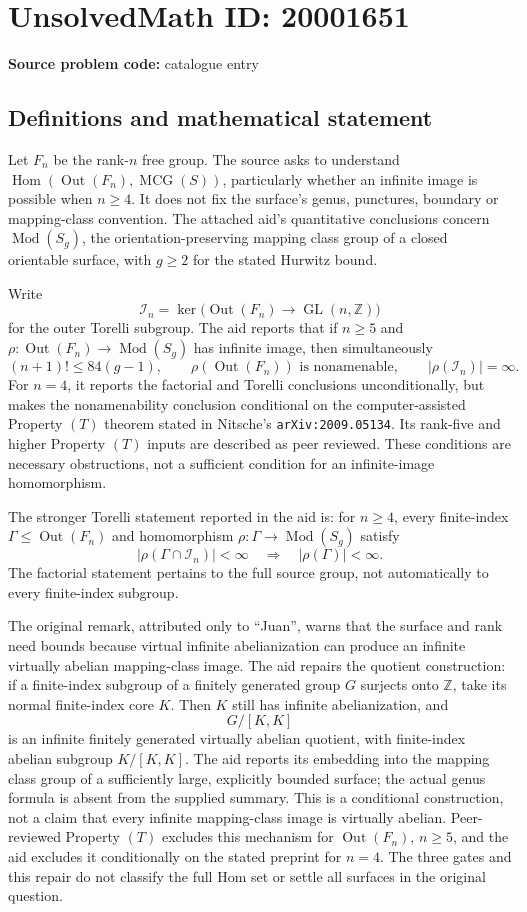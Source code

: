 \documentclass[11pt]{article}
\newcommand{\Z}{\mathbb{Z}}
\begin{document}
\section*{UnsolvedMath ID: 20001651}
\textbf{Source problem code:} catalogue entry
\subsection{Definitions and mathematical statement}
Let \(F_n\) be the rank-\(n\) free group. The source asks to understand \(\operatorname{Hom}(\operatorname{Out}(F_n),\operatorname{MCG}(S))\), particularly whether an infinite image is possible when \(n\ge4\). It does not fix the surface's genus, punctures, boundary or mapping-class convention. The attached aid's quantitative conclusions concern \(\operatorname{Mod}(S_g)\), the orientation-preserving mapping class group of a closed orientable surface, with \(g\ge2\) for the stated Hurwitz bound.

Write
\[
 \mathcal I_n=\ker\bigl(\operatorname{Out}(F_n)\to\operatorname{GL}(n,\Z)\bigr)
\]
for the outer Torelli subgroup. The aid reports that if \(n\ge5\) and \(\rho:\operatorname{Out}(F_n)\to\operatorname{Mod}(S_g)\) has infinite image, then simultaneously
\[
 (n+1)!\le84(g-1),\qquad
 \rho(\operatorname{Out}(F_n))\text{ is nonamenable},\qquad
 |\rho(\mathcal I_n)|=\infty.
\]
For \(n=4\), it reports the factorial and Torelli conclusions unconditionally, but makes the nonamenability conclusion conditional on the computer-assisted Property \((T)\) theorem stated in Nitsche's \texttt{arXiv:2009.05134}. Its rank-five and higher Property \((T)\) inputs are described as peer reviewed. These conditions are necessary obstructions, not a sufficient condition for an infinite-image homomorphism.

The stronger Torelli statement reported in the aid is: for \(n\ge4\), every finite-index \(\Gamma\le\operatorname{Out}(F_n)\) and homomorphism \(\rho:\Gamma\to\operatorname{Mod}(S_g)\) satisfy
\[
 |\rho(\Gamma\cap\mathcal I_n)|<\infty
 \quad\Longrightarrow\quad |\rho(\Gamma)|<\infty.
\]
The factorial statement pertains to the full source group, not automatically to every finite-index subgroup.

The original remark, attributed only to ``Juan'', warns that the surface and rank need bounds because virtual infinite abelianization can produce an infinite virtually abelian mapping-class image. The aid repairs the quotient construction: if a finite-index subgroup of a finitely generated group \(G\) surjects onto \(\Z\), take its normal finite-index core \(K\). Then \(K\) still has infinite abelianization, and
\[
 G/[K,K]
\]
is an infinite finitely generated virtually abelian quotient, with finite-index abelian subgroup \(K/[K,K]\). The aid reports its embedding into the mapping class group of a sufficiently large, explicitly bounded surface; the actual genus formula is absent from the supplied summary. This is a conditional construction, not a claim that every infinite mapping-class image is virtually abelian. Peer-reviewed Property \((T)\) excludes this mechanism for \(\operatorname{Out}(F_n)\), \(n\ge5\), and the aid excludes it conditionally on the stated preprint for \(n=4\). The three gates and this repair do not classify the full Hom set or settle all surfaces in the original question.
\end{document}
